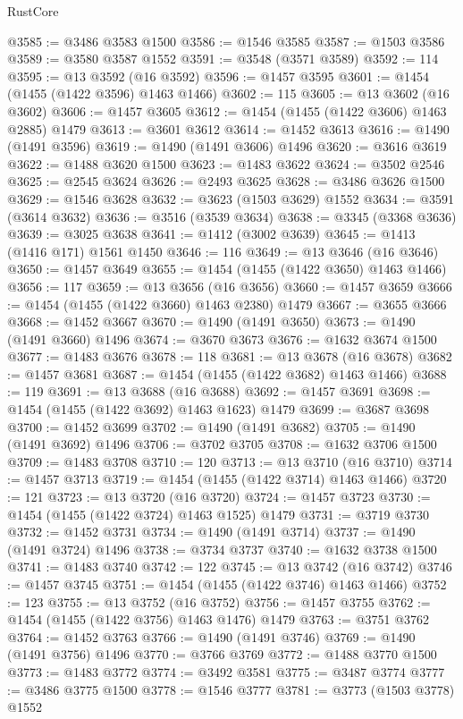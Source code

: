 \begin{lexlean}{RustCore}
\begin{coremodule}
@3585 := @3486 @3583 @1500
@3586 := @1546 @3585
@3587 := @1503 @3586
@3589 := @3580 @3587 @1552
@3591 := @3548 (@3571 @3589)
@3592 := 114
@3595 := @13 @3592 (@16 @3592)
@3596 := @1457 @3595
@3601 := @1454 (@1455 (@1422 @3596) @1463 @1466)
@3602 := 115
@3605 := @13 @3602 (@16 @3602)
@3606 := @1457 @3605
@3612 := @1454 (@1455 (@1422 @3606) @1463 @2885) @1479
@3613 := @3601 @3612
@3614 := @1452 @3613
@3616 := @1490 (@1491 @3596)
@3619 := @1490 (@1491 @3606) @1496
@3620 := @3616 @3619
@3622 := @1488 @3620 @1500
@3623 := @1483 @3622
@3624 := @3502 @2546
@3625 := @2545 @3624
@3626 := @2493 @3625
@3628 := @3486 @3626 @1500
@3629 := @1546 @3628
@3632 := @3623 (@1503 @3629) @1552
@3634 := @3591 (@3614 @3632)
@3636 := @3516 (@3539 @3634)
@3638 := @3345 (@3368 @3636)
@3639 := @3025 @3638
@3641 := @1412 (@3002 @3639)
@3645 := @1413 (@1416 @171) @1561 @1450
@3646 := 116
@3649 := @13 @3646 (@16 @3646)
@3650 := @1457 @3649
@3655 := @1454 (@1455 (@1422 @3650) @1463 @1466)
@3656 := 117
@3659 := @13 @3656 (@16 @3656)
@3660 := @1457 @3659
@3666 := @1454 (@1455 (@1422 @3660) @1463 @2380) @1479
@3667 := @3655 @3666
@3668 := @1452 @3667
@3670 := @1490 (@1491 @3650)
@3673 := @1490 (@1491 @3660) @1496
@3674 := @3670 @3673
@3676 := @1632 @3674 @1500
@3677 := @1483 @3676
@3678 := 118
@3681 := @13 @3678 (@16 @3678)
@3682 := @1457 @3681
@3687 := @1454 (@1455 (@1422 @3682) @1463 @1466)
@3688 := 119
@3691 := @13 @3688 (@16 @3688)
@3692 := @1457 @3691
@3698 := @1454 (@1455 (@1422 @3692) @1463 @1623) @1479
@3699 := @3687 @3698
@3700 := @1452 @3699
@3702 := @1490 (@1491 @3682)
@3705 := @1490 (@1491 @3692) @1496
@3706 := @3702 @3705
@3708 := @1632 @3706 @1500
@3709 := @1483 @3708
@3710 := 120
@3713 := @13 @3710 (@16 @3710)
@3714 := @1457 @3713
@3719 := @1454 (@1455 (@1422 @3714) @1463 @1466)
@3720 := 121
@3723 := @13 @3720 (@16 @3720)
@3724 := @1457 @3723
@3730 := @1454 (@1455 (@1422 @3724) @1463 @1525) @1479
@3731 := @3719 @3730
@3732 := @1452 @3731
@3734 := @1490 (@1491 @3714)
@3737 := @1490 (@1491 @3724) @1496
@3738 := @3734 @3737
@3740 := @1632 @3738 @1500
@3741 := @1483 @3740
@3742 := 122
@3745 := @13 @3742 (@16 @3742)
@3746 := @1457 @3745
@3751 := @1454 (@1455 (@1422 @3746) @1463 @1466)
@3752 := 123
@3755 := @13 @3752 (@16 @3752)
@3756 := @1457 @3755
@3762 := @1454 (@1455 (@1422 @3756) @1463 @1476) @1479
@3763 := @3751 @3762
@3764 := @1452 @3763
@3766 := @1490 (@1491 @3746)
@3769 := @1490 (@1491 @3756) @1496
@3770 := @3766 @3769
@3772 := @1488 @3770 @1500
@3773 := @1483 @3772
@3774 := @3492 @3581
@3775 := @3487 @3774
@3777 := @3486 @3775 @1500
@3778 := @1546 @3777
@3781 := @3773 (@1503 @3778) @1552

\end{coremodule}
\end{lexlean}

